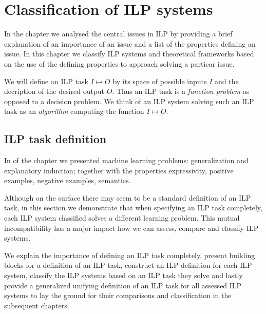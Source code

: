 \chapter{Classification of ILP systems}\label{chap:classification_of_ilp_systems}

In the chapter  we analysed the central issues in ILP by providing a brief explanation of an importance of an issue and a list of the properties defining an issue. In this chapter we classify ILP systems and theoretical frameworks based on the use of the defining properties to approach solving a particar issue.

We will define an ILP task $I \mapsto O$ by its space of possible inputs $I$ and the decription of the desired output $O$. Thus an ILP task is a \emph{function problem} as opposed to a decision problem. We think of an ILP system solving such an ILP task as an \emph{algorithm} computing the function $I \mapsto O$.

\section{ILP task definition}
In  of the chapter  we presented machine learning problems: generalization and explanatory induction; together with the properties expressivity, positive examples, negative examples, semantics.

Although on the surface there may seem to be a standard definition of an ILP task, in this section we demonstrate that when specifying an ILP task completely, each ILP system classified solves a different learning problem. This mutual incompatibility has a major impact how we can assess, compare and classify ILP systems.

We explain the importance of defining an ILP task completely, present building blocks for a definition of an ILP task, construct an ILP definition for each ILP system, classify the ILP systems based on an ILP task they solve and lastly provide a generalized unifying definition of an ILP task for all assessed ILP systems to lay the ground for their comparisons and classification in the subsequent chapters.

